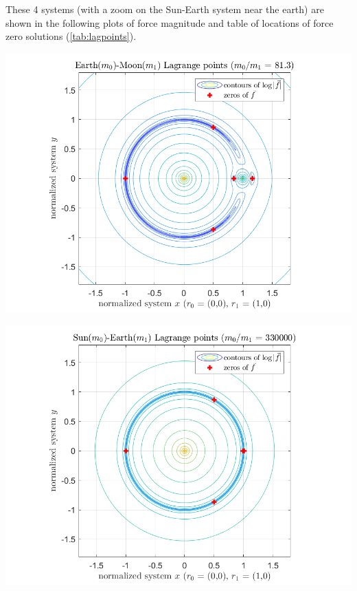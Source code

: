 \documentclass[twoside,11pt]{article}
\begin{document}
These 4 systems (with a zoom on the Sun-Earth system near the earth) are shown in the following plots of force magnitude and table of locations of force zero solutions (\ref*{tab:lagpoints}).

\begin{minipage}{\textwidth}
	\begin{center}
		
		\label{tab:lagpoints}
	\end{center}
\end{minipage}

\begin{minipage}{\textwidth}
	\begin{center}
		\includegraphics[width=0.8\linewidth]{../Earth-Moon.png}
		\label{fig:earthmoon}
	\end{center}
\end{minipage}

\begin{minipage}{\textwidth}
	\begin{center}
		\includegraphics[width=0.8\linewidth]{../Sun-Earth.png}
		\label{fig:sunearth}
	\end{center}
\end{minipage}
\end{document}
